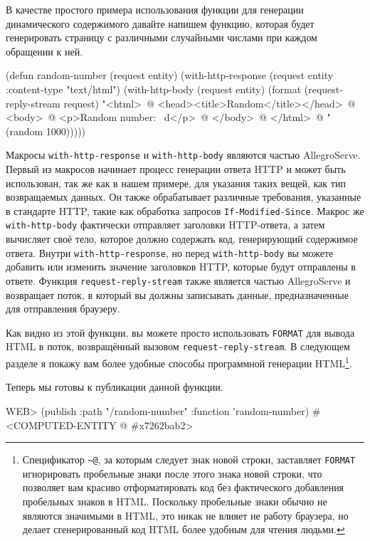В качестве простого примера использования функции для генерации динамического
содержимого давайте напишем функцию, которая будет генерировать страницу с различными
случайными числами при каждом обращении к ней.

\begin{myverb}
(defun random-number (request entity)
  (with-http-response (request entity :content-type "text/html")
    (with-http-body (request entity)
      (format 
       (request-reply-stream request)
       "<html>~@
        <head><title>Random</title></head>~@
        <body>~@
        <p>Random number: ~d</p>~@
        </body>~@
        </html>~@
       "
       (random 1000)))))
\end{myverb}

Макросы \lstinline{with-http-response} и \lstinline{with-http-body} являются частью
AllegroServe. Первый из макросов начинает процесс генерации ответа HTTP и может быть
использован, так же как в нашем примере, для указания таких вещей, как тип возвращаемых
данных. Он также обрабатывает различные требования, указанные в стандарте HTTP, такие как
обработка запросов \lstinline{If-Modified-Since}. Макрос же \lstinline{with-http-body} фактически
отправляет заголовки HTTP-ответа, а затем вычисляет своё тело, которое должно содержать
код, генерирующий содержимое ответа. Внутри \lstinline{with-http-response}, но перед
\lstinline{with-http-body} вы можете добавить или изменить значение заголовков HTTP, которые
будут отправлены в ответе. Функция \lstinline{request-reply-stream} также является частью
AllegroServe и возвращает поток, в который вы должны записывать данные, предназначенные для
отправления браузеру.

Как видно из этой функции, вы можете просто использовать \lstinline{FORMAT} для вывода HTML в
поток, возвращённый вызовом \lstinline{request-reply-stream}. В следующем разделе я покажу вам
более удобные способы программной генерации HTML\footnote{Спецификатор \lstinline{~@}, за
  которым следует знак новой строки, заставляет \lstinline{FORMAT} игнорировать пробельные
  знаки после этого знака новой строки, что позволяет вам красиво отформатировать код без
  фактического добавления пробельных знаков в HTML. Поскольку пробельные знаки обычно не
  являются значимыми в HTML, это никак не влияет не работу браузера, но делает
  сгенерированный код HTML более удобным для чтения людьми.}.

Теперь мы готовы к публикации данной функции.

\begin{myverb}
WEB> (publish :path "/random-number" :function 'random-number)
#<COMPUTED-ENTITY @ #x7262bab2>
\end{myverb}

